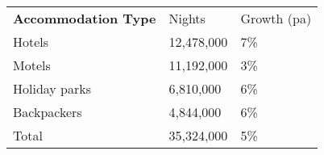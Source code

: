 \begin{tabular}[t]{p{4.5cm}>{\hfill}p{1.3cm}>{\hfill}p{1.7cm}}
 \textbf{Accommodation Type} & Nights & Growth (pa) \\ 
 Hotels & 12,478,000 & 7\% \\ 
  Motels & 11,192,000 & 3\% \\ 
  Holiday parks &  6,810,000 & 6\% \\ 
  Backpackers &  4,844,000 & 6\% \\ 
  Total & 35,324,000 & 5\% \\ 
  \end{tabular}
